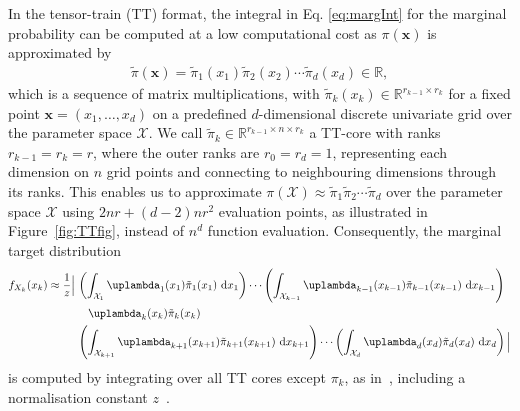 In the tensor-train (TT) format, the integral in Eq. \ref{eq:margInt} for the marginal probability can be computed at a low computational cost as $\pi(\bm{x})$ is approximated by
\begin{align*}
	\tilde{\pi}(\bm{x}) = 	\tilde{\pi}_1(x_1)  \tilde{\pi}_2(x_2)  \cdots \tilde{\pi}_d(x_d)  \in \mathbb{R},
\end{align*}
which is a sequence of matrix multiplications, with $\tilde{\pi}_k(x_k) \in \mathbb{R}^{r_{k-1} \times r_k}$ for a fixed point $\bm{x} = (x_1, \dots, x_d)$ on a predefined $d$-dimensional discrete univariate grid over the parameter space $\mathcal{X}$. 
We call $\tilde{\pi}_k \in \mathbb{R}^{r_{k-1} \times n \times r_k}$ a TT-core with ranks $ r_{k-1} = r_k= r$, where the outer ranks are $r_0 = r_d = 1$, representing each dimension on $n$ grid points and connecting to neighbouring dimensions through its ranks.
This enables us to approximate $\pi(\mathcal{X})\approx \tilde{\pi}_1  \tilde{\pi}_2  \cdots \tilde{\pi}_d$ over the parameter space $\mathcal{X}$ using $2nr + (d-2)nr^2$ evaluation points, as illustrated in Figure~\ref{fig:TTfig}, instead of $n^d$ function evaluation.
Consequently, the marginal target distribution
\begin{align}
	\begin{split}
		f_{X_k}(x_k) \approx \frac{1}{z} \Big|\, 
		&\left( \int_{\mathcal{X}_1} \uplambda_1(x_1) \tilde{\pi}_1(x_1) \, \diff x_1 \right) \cdots 
		\left( \int_{\mathcal{X}_{k-1}} \uplambda_{k-1}(x_{k-1}) \tilde{\pi}_{k-1}(x_{k-1}) \, \diff x_{k-1} \right) \\
		&\quad \uplambda_k(x_k) \tilde{\pi}_k(x_k) \\
		& \left( \int_{\mathcal{X}_{k+1}} \uplambda_{k+1}(x_{k+1}) \tilde{\pi}_{k+1}(x_{k+1}) \,\diff x_{k+1} \right) \cdots 
		\left( \int_{\mathcal{X}_{d}} \uplambda_d(x_d) \tilde{\pi}_d(x_d) \, \diff x_d \right)
		\Big| 
	\end{split}
\end{align}
is computed by integrating over all TT cores except $\pi_k$, as in~\cite{dolgov2020approximation}, including a normalisation constant $z$~\cite{cui2022deep}.

